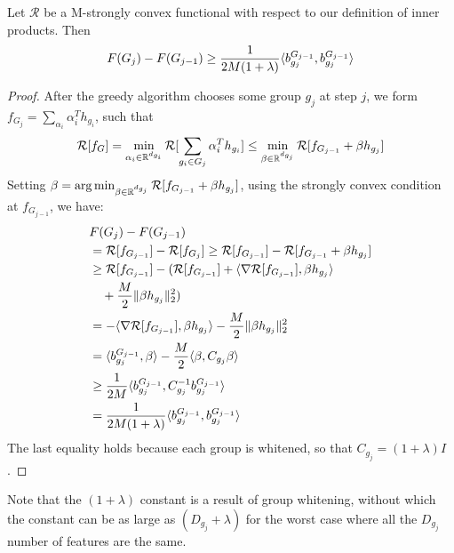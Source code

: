 \begin{lemma}
  Let $\mathcal{R}$ be a M-strongly convex functional with respect to our definition of 
  inner products. Then
    \begin{align}
      F(G_j) - F(G_{j-1}) \geq \frac{1}{2M (1 + \lambda) } \langle {b^{G_{j-1}}_{g_j}}, b^{G_{j-1}}_{g_j}  \rangle
    \end{align}
  \label{lemma:convexity_glm}
\end{lemma}
\begin{proof}
After the greedy algorithm chooses some group $g_j$ at step $j$, 
  we form $f_{G_j} = \sum _{\alpha _i} \alpha_i^T h_{g_i}$, such that
   \[
    \mathcal{R}[f_G] = \min _{ \alpha _i \in \mathbb{R}^{d_{g_i}}} 
      \mathcal{R}[ \sum _{g_i \in G_j} \alpha_i^T h_{g_i}] \leq
      \min _{\beta \in \mathbb{R}^{d_{g_j}}} 
    \mathcal{R}[f_{G_{j-1}} + \beta h_{g_j}]
   \]
 Setting $\beta = \arg \min _{\beta \in \mathbb{R}^{d_{g_j}}} 
    \mathcal{R}[f_{G_{j-1}} + \beta h_{g_j}]$, using the strongly convex condition at
      $f_{G_{j-1}}$, we have:
 \begin{align*}
    &{} F(G_j) - F(G_{j-1}) \\
    &=  \mathcal{R}[f_{G_{j-1}}] - \mathcal{R}[f_{G_j}] 
    \geq \mathcal{R}[f_{G_{j-1}}] - \mathcal{R}[f_{G_{j-1}} + \beta h_{g_j}] \\ 
    &\geq  \mathcal{R}[f_{G_{j-1}}] - 
      (\mathcal{R}[f_{G_{j-1}}] + 
        \langle  \nabla \mathcal{R}[f_{G_{j-1}}] , 
        \beta h_{g_j}  \rangle \notag \\
    &\quad + \frac{M}{2} \Vert \beta h_{g_j} \Vert _2^2) \\
    &=  -  \langle  \nabla \mathcal{R}[f_{G_{j-1}}] , 
        \beta h_{g_j}  \rangle
       - \frac{M}{2} \Vert \beta h_{g_j} \Vert _2^2 \\
    &=  \langle {b^{{G_{j-1}}}_{g_j}},  \beta \rangle - \frac{M}{2} \langle \beta, C_{g_j} \beta \rangle \\
    &\geq  \frac{1}{2M} \langle  b^{{G_{j-1}}}_{g_j}, C_{g_j}^{-1} b^{{G_{j-1}}}_{g_j} \rangle \\
    &=  \frac{1}{2M (1+\lambda)} \langle {b^{{G_{j-1}}}_{g_j}}, b^{{G_{j-1}}}_{g_j} \rangle
 \end{align*}
 The last equality holds because each group is whitened, 
 so that $C_{g_j} = (1 + \lambda) I$.
\end{proof}
Note that the $(1+\lambda)$ constant is a result of group whitening, without which
the constant can be as large as $(D_{g_j} + \lambda)$ for  the worst case where
all the $D_{g_j}$ number of features are the same. \\

